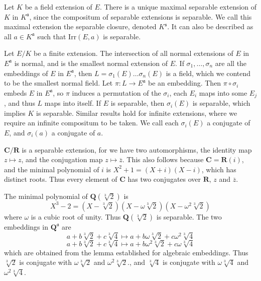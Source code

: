 \begin{example}
    Let $K$ be a field extension of $E$. There is a unique maximal separable extension of $K$ in $K^{\mathfrak{a}}$, since the compositum of separable extensions is separable. We call this maximal extension the separable closure, denoted $K^{\mathfrak{s}}$. It can also be described as all $a \in K^{\mathfrak{a}}$ such that $\text{Irr}(E,a)$ is separable.
\end{example}

Let $E/K$ be a finite extension. The intersection of all normal extensions of $E$ in $E^{\mathfrak{a}}$ is normal, and is the smallest normal extension of $E$. If $\sigma_1, \dots, \sigma_n$ are all the embeddings of $E$ in $E^{\mathfrak{a}}$, then $L = \sigma_1(E) \dots \sigma_n(E)$ is a field, which we contend to be the smallest normal field. Let $\pi: L \to E^{\mathfrak{a}}$ be an embedding. Then $\pi \circ \sigma_i$ embeds $E$ in $E^{\mathfrak{a}}$, so $\pi$ induces a permutation of the $\sigma_i$, each $E_i$ maps into some $E_j$, and thus $L$ maps into itself. If $E$ is separable, then $\sigma_i(E)$ is separable, which implies $K$ is separable. Similar results hold for infinite extensions, where we require an infinite compositum to be taken. We call each $\sigma_i(E)$ a conjugate of $E$, and $\sigma_i(a)$ a conjugate of $a$.

\begin{example}
    $\mathbf{C}/\mathbf{R}$ is a separable extension, for we have two automorphisms, the identity map $z \mapsto z$, and the conjugation map $z \mapsto \overline{z}$. This also follows because $\mathbf{C} = \mathbf{R}(i)$, and the minimal polynomial of $i$ is $X^2 + 1 = (X + i)(X - i)$, which has distinct roots. Thus every element of $\mathbf{C}$ has two conjugates over $\mathbf{R}$, $z$ and $\overline{z}$.
\end{example}

\begin{example}
    The minimal polynomial of $\mathbf{Q}(\sqrt[3]{2})$ is
    \[ X^3 - 2 = (X - \sqrt[3]{2})(X - \omega \sqrt[3]{2})(X - \omega^2 \sqrt[3]{2}) \]
    where $\omega$ is a cubic root of unity. Thus $\mathbf{Q}(\sqrt[3]{2})$ is separable. The two embeddings in $\mathbf{Q}^{\mathfrak{a}}$ are
    \[ a + b \sqrt[3]{2} + c \sqrt[3]{4} \mapsto a + b \omega \sqrt[3]{2} + c \omega^2 \sqrt[3]{4} \]
    \[ a + b \sqrt[3]{2} + c \sqrt[3]{4} \mapsto a + b \omega^2 \sqrt[3]{2} + c \omega \sqrt[3]{4} \]
    which are obtained from the lemma established for algebraic embeddings. Thus $\sqrt[3]{2}$ is conjugate with $\omega \sqrt[3]{2}$ and $\omega^2 \sqrt[3]{2}$., and $\sqrt[3]{4}$ is conjugate with $\omega \sqrt[3]{4}$ and $\omega^2 \sqrt[3]{4}$.
\end{example}

